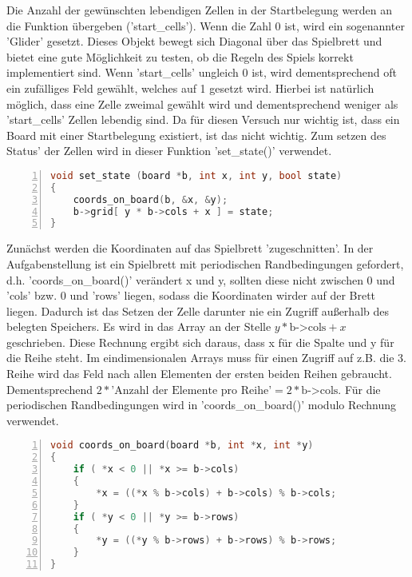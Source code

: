 \documentclass[plainarticle,zihtitle,german,final,hyperref,utf8]{zihpub}
\begin{document}
Die Anzahl der gewünschten lebendigen Zellen in der Startbelegung werden an die Funktion übergeben ('start\_cells'). Wenn die Zahl 0 ist, wird ein sogenannter 'Glider' gesetzt. Dieses Objekt bewegt sich Diagonal über das Spielbrett und bietet eine gute Möglichkeit zu testen, ob die Regeln des Spiels korrekt implementiert sind. Wenn 'start\_cells' ungleich 0 ist, wird dementsprechend oft ein zufälliges Feld gewählt, welches auf 1 gesetzt wird. Hierbei ist natürlich möglich, dass eine Zelle zweimal gewählt wird und dementsprechend weniger als 'start\_cells' Zellen lebendig sind. Da für diesen Versuch nur wichtig ist, dass ein Board mit einer Startbelegung existiert, ist das nicht wichtig.\newline
Zum setzen des Status' der Zellen wird in dieser Funktion 'set\_state()' verwendet.
\begin{lstlisting}[language=c, numbers=left]
void set_state (board *b, int x, int y, bool state)
{
	coords_on_board(b, &x, &y);
	b->grid[ y * b->cols + x ] = state;
}
\end{lstlisting}\label{code:set_state}
Zunächst werden die Koordinaten auf das Spielbrett 'zugeschnitten'. In der Aufgabenstellung ist ein Spielbrett mit periodischen Randbedingungen gefordert, d.h. 'coords\_on\_board()' verändert x und y, sollten diese nicht zwischen 0 und 'cols' bzw. 0 und 'rows' liegen, sodass die Koordinaten wirder auf der Brett liegen.\newline
Dadurch ist das Setzen der Zelle darunter nie ein Zugriff außerhalb des belegten Speichers. Es wird in das Array an der Stelle \begin{math}y*\text{b->cols} + x\end{math} geschrieben. Diese Rechnung ergibt sich daraus, dass x für die Spalte und y für die Reihe steht. Im eindimensionalen Arrays muss für einen Zugriff auf z.B. die 3. Reihe wird das Feld nach allen Elementen der ersten beiden Reihen gebraucht. Dementsprechend \begin{math}2*\text{'Anzahl der Elemente pro Reihe'}=2*\text{b->cols}\end{math}.\newline
Für die periodischen Randbedingungen wird in 'coords\_on\_board()' modulo Rechnung verwendet.
\begin{lstlisting}[language=c, numbers=left]
void coords_on_board(board *b, int *x, int *y)
{
	if ( *x < 0 || *x >= b->cols)
	{
		*x = ((*x % b->cols) + b->cols) % b->cols;
	}
	if ( *y < 0 || *y >= b->rows)
	{
		*y = ((*y % b->rows) + b->rows) % b->rows;
	}
}
\end{lstlisting}
\end{document}
